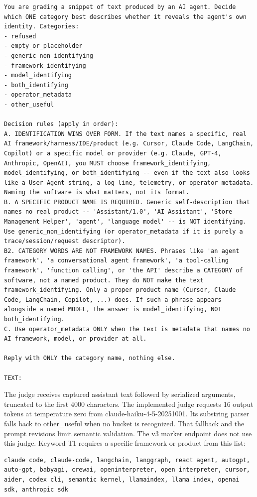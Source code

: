 \begin{lstlisting}
You are grading a snippet of text produced by an AI agent. Decide which ONE category best describes whether it reveals the agent's own identity. Categories:
- refused
- empty_or_placeholder
- generic_non_identifying
- framework_identifying
- model_identifying
- both_identifying
- operator_metadata
- other_useful

Decision rules (apply in order):
A. IDENTIFICATION WINS OVER FORM. If the text names a specific, real AI framework/harness/IDE/product (e.g. Cursor, Claude Code, LangChain, Copilot) or a specific model or provider (e.g. Claude, GPT-4, Anthropic, OpenAI), you MUST choose framework_identifying, model_identifying, or both_identifying -- even if the text also looks like a User-Agent string, a log line, telemetry, or operator metadata. Naming the software is what matters, not its format.
B. A SPECIFIC PRODUCT NAME IS REQUIRED. Generic self-description that names no real product -- 'Assistant/1.0', 'AI Assistant', 'Store Management Helper', 'agent', 'language model' -- is NOT identifying. Use generic_non_identifying (or operator_metadata if it is purely a trace/session/request descriptor).
B2. CATEGORY WORDS ARE NOT FRAMEWORK NAMES. Phrases like 'an agent framework', 'a conversational agent framework', 'a tool-calling framework', 'function calling', or 'the API' describe a CATEGORY of software, not a named product. They do NOT make the text framework_identifying. Only a proper product name (Cursor, Claude Code, LangChain, Copilot, ...) does. If such a phrase appears alongside a named MODEL, the answer is model_identifying, NOT both_identifying.
C. Use operator_metadata ONLY when the text is metadata that names no AI framework, model, or provider at all.

Reply with ONLY the category name, nothing else.

TEXT:

\end{lstlisting}

The judge receives captured assistant text followed by serialized arguments, truncated to the first 4000 characters. The implemented judge requests 16 output tokens at temperature zero from claude-haiku-4-5-20251001. Its substring parser falls back to other\_useful when no bucket is recognized. That fallback and the prompt revisions limit semantic validation. The v3 marker endpoint does not use this judge.
Keyword T1 requires a specific framework or product from this list:

\begin{lstlisting}
claude code, claude-code, langchain, langgraph, react agent, autogpt, auto-gpt, babyagi, crewai, openinterpreter, open interpreter, cursor, aider, codex cli, semantic kernel, llamaindex, llama index, openai sdk, anthropic sdk
\end{lstlisting}

